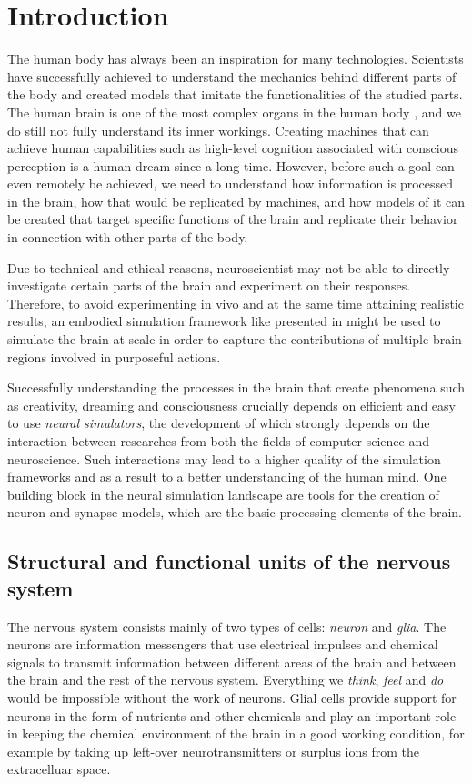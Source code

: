 \chapter{Introduction}


The human body has always been an inspiration for many technologies. Scientists have successfully achieved to understand the mechanics behind different parts of the body and created models that imitate the functionalities of the studied parts. The human brain is one of the most complex organs in the human body \citep{vanderah2020nolte}, and we do still not fully understand its inner workings. Creating machines that can achieve human capabilities such as high-level cognition associated with conscious perception is a human dream since a long time. However, before such a goal can even remotely be achieved, we need to understand how information is processed in the brain, how that would be replicated by machines, and how models of it can be created that target specific functions of the brain and replicate their behavior in connection with other parts of the body.

Due to technical and ethical reasons, neuroscientist may not be able to directly investigate certain parts of the brain and experiment on their responses. Therefore, to avoid experimenting in vivo and at the same time attaining realistic results, an embodied simulation framework like presented in \citet{10.3389/fninf.2022.884180} might be used to simulate the brain at scale in order to capture the contributions of multiple brain regions involved in purposeful actions.

Successfully understanding the processes in the brain that create phenomena such as creativity, dreaming and consciousness crucially depends on efficient and easy to use \emph{neural simulators}, the development of which strongly depends on the interaction between researches from both the fields of computer science and neuroscience. Such interactions may lead to a higher quality of the simulation frameworks and as a result to a better understanding of the human mind. One building block in the neural simulation landscape are tools for the creation of neuron and synapse models, which are the basic processing elements of the brain.

\section{Structural and functional units of the nervous system}

The nervous system consists mainly of two types of cells: \emph{neuron} and \emph{glia}. The neurons are information messengers that use electrical impulses and chemical signals to transmit information between different areas of the brain and between the brain and the rest of the nervous system. Everything we \emph{think}, \emph{feel} and \emph{do} would be impossible without the work of neurons. Glial cells provide support for neurons in the form of nutrients and other chemicals and play an important role in keeping the chemical environment of the brain in a good working condition, for example by taking up left-over neurotransmitters or surplus ions from the extracelluar space.

